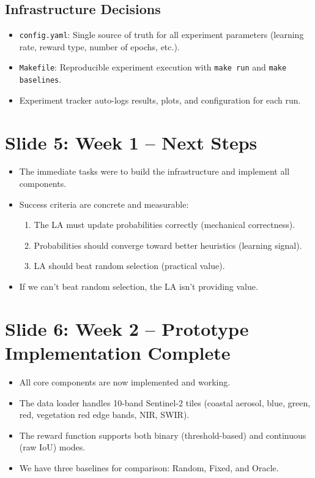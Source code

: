 \documentclass[11pt]{article}
\newenvironment{talkingpoints}{%
  \begin{itemize}[leftmargin=1.5em, itemsep=0.3em]
}{%
  \end{itemize}
}
\begin{document}
\subsection{Infrastructure Decisions}

\begin{talkingpoints}
  \item \texttt{config.yaml}: Single source of truth for all experiment parameters (learning rate, reward type, number of epochs, etc.).
  \item \texttt{Makefile}: Reproducible experiment execution with \texttt{make run} and \texttt{make baselines}.
  \item Experiment tracker auto-logs results, plots, and configuration for each run.
\end{talkingpoints}

\section{Slide 5: Week 1 -- Next Steps}

\begin{talkingpoints}
  \item The immediate tasks were to build the infrastructure and implement all components.
  \item Success criteria are concrete and measurable:
  \begin{enumerate}
    \item The LA must update probabilities correctly (mechanical correctness).
    \item Probabilities should converge toward better heuristics (learning signal).
    \item LA should beat random selection (practical value).
  \end{enumerate}
  \item If we can't beat random selection, the LA isn't providing value.
\end{talkingpoints}

\section{Slide 6: Week 2 -- Prototype Implementation Complete}

\begin{talkingpoints}
  \item All core components are now implemented and working.
  \item The data loader handles 10-band Sentinel-2 tiles (coastal aerosol, blue, green, red, vegetation red edge bands, NIR, SWIR).
  \item The reward function supports both binary (threshold-based) and continuous (raw IoU) modes.
  \item We have three baselines for comparison: Random, Fixed, and Oracle.
\end{talkingpoints}
\end{document}
